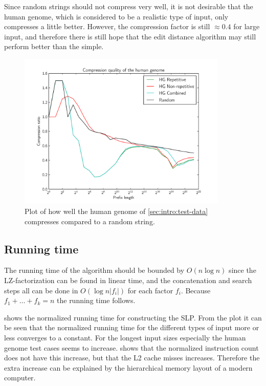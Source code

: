 \documentclass[twoside,11pt,openright]{report}
\begin{document}
Since random strings should not compress very well, it is not desirable that the human genome, which is considered to be a realistic type of input, only compresses a little better. However, the compression factor is still $\approx 0.4$ for large input, and therefore there is still hope that the edit distance algorithm may still perform better than the simple.

\begin{figure}[h!]
  \centering
  \includegraphics[width=10cm]{compression/hg}
  \caption{Plot of how well the human genome of \cref{sec:intro:test-data} compresses compared to a random string.}
  \label{fig:compression:quality:hg}
\end{figure}

\subsection{Running time}
The running time of the algorithm should be bounded by $O(n\log{n})$ since the LZ-factorization can be found in linear time, and the concatenation and search steps all can be done in $O(\log{n} |f_i|)$ for each factor $f_i$. Because $f_1 + \dots + f_k = n$ the running time follows.

 shows the normalized running time for constructing the SLP. From the plot it can be seen that the normalized running time for the different types of input more or less converges to a constant. For the longest input sizes especially the human genome test cases seems to increase.  shows that the normalized instruction count does not have this increase, but that the L2 cache misses increases. Therefore the extra increase can be explained by the hierarchical memory layout of a modern computer.
\end{document}
